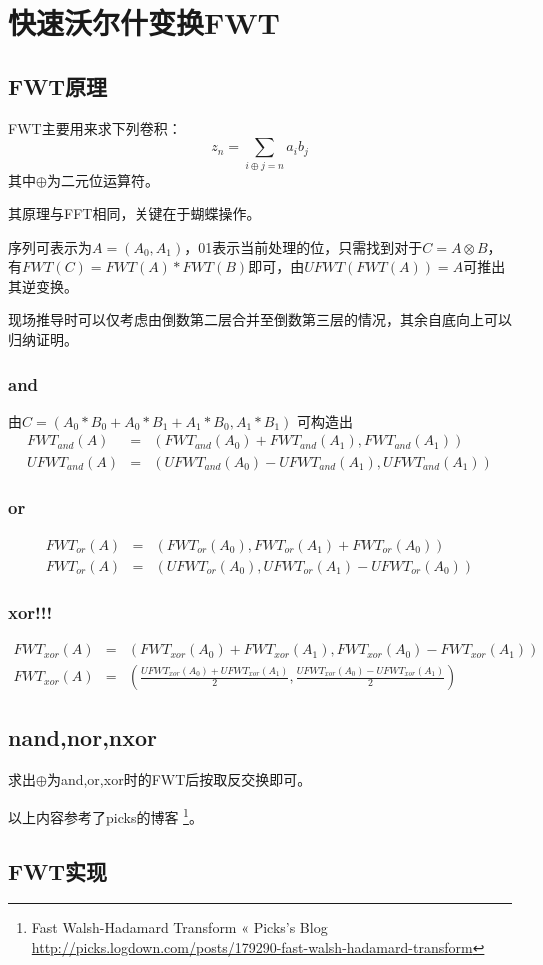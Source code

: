 \section{快速沃尔什变换FWT}
\subsection{FWT原理}
FWT主要用来求下列卷积：
\begin{displaymath}
    z_n=\sum_{i\oplus j=n}{a_ib_j}
\end{displaymath}
其中$\oplus$为二元位运算符。

其原理与FFT相同，关键在于蝴蝶操作。

序列可表示为$A=(A_0,A_1)$，01表示当前处理的位，只需找到对于$C=A\otimes B$，
有$FWT(C)=FWT(A)*FWT(B)$即可，由$UFWT(FWT(A))=A$可推出其逆变换。

现场推导时可以仅考虑由倒数第二层合并至倒数第三层的情况，其余自底向上可以归纳证明。

\subsubsection{and}
由$C=(A_0*B_0+A_0*B_1+A_1*B_0,A_1*B_1)$
可构造出
\begin{eqnarray*}
    FWT_{and}(A)&=&(FWT_{and}(A_0)+FWT_{and}(A_1),FWT_{and}(A_1))\\
    UFWT_{and}(A)&=&(UFWT_{and}(A_0)-UFWT_{and}(A_1),UFWT_{and}(A_1))
\end{eqnarray*}
\subsubsection{or}
\begin{eqnarray*}
    FWT_{or}(A)&=&(FWT_{or}(A_0),FWT_{or}(A_1)+FWT_{or}(A_0))\\
    FWT_{or}(A)&=&(UFWT_{or}(A_0),UFWT_{or}(A_1)-UFWT_{or}(A_0))
\end{eqnarray*}
\subsubsection{xor!!!}
\begin{eqnarray*}
    FWT_{xor}(A)&=&(FWT_{xor}(A_0)+FWT_{xor}(A_1),FWT_{xor}(A_0)-FWT_{xor}(A_1))\\
    FWT_{xor}(A)&=&\left(\frac{UFWT_{xor}(A_0)+UFWT_{xor}(A_1)}{2},
    \frac{UFWT_{xor}(A_0)-UFWT_{xor}(A_1)}{2}\right)
\end{eqnarray*}
\subsection{nand,nor,nxor}
求出$\oplus$为and,or,xor时的FWT后按取反交换即可。

以上内容参考了picks的博客
\footnote{Fast Walsh-Hadamard Transform « Picks's Blog
    \url{http://picks.logdown.com/posts/179290-fast-walsh-hadamard-transform}}。
\subsection{FWT实现}

